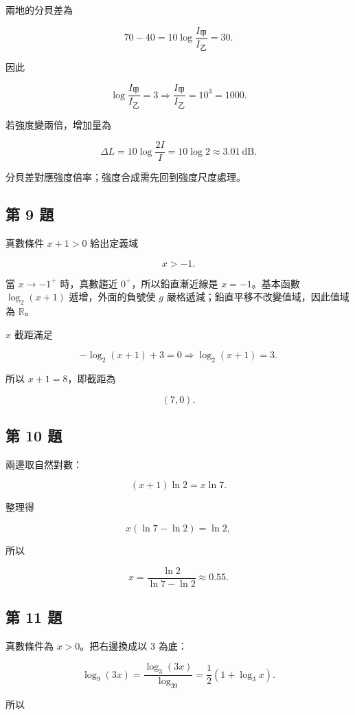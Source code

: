 \documentclass[11pt,a4paper]{article}
\begin{document}
兩地的分貝差為

\[
70-40
=10\log\frac{I_{\text{甲}}}{I_{\text{乙}}}
=30.
\]

因此

\[
\log\frac{I_{\text{甲}}}{I_{\text{乙}}}=3
\Rightarrow
\boxed{\frac{I_{\text{甲}}}{I_{\text{乙}}}=10^3=1000}.
\]

若強度變兩倍，增加量為

\[
\Delta L
=10\log\frac{2I}{I}
=10\log2
\approx\boxed{3.01\ \mathrm{dB}}.
\]

分貝差對應強度倍率；強度合成需先回到強度尺度處理。

\subsection{第 9 題}\label{ux7b2c-9-ux984c}

真數條件 \(x+1>0\) 給出定義域

\[
\boxed{x>-1}.
\]

當 \(x\to-1^+\) 時，真數趨近 \(0^+\)，所以鉛直漸近線是 \(\boxed{x=-1}\)。基本函數 \(\log_2(x+1)\) 遞增，外面的負號使 \(g\) 嚴格遞減；鉛直平移不改變值域，因此值域為 \(\mathbb R\)。

\(x\) 截距滿足

\[
-\log_2(x+1)+3=0
\Longrightarrow
\log_2(x+1)=3.
\]

所以 \(x+1=8\)，即截距為

\[
\boxed{(7,0)}.
\]

\subsection{第 10 題}\label{ux7b2c-10-ux984c}

兩邊取自然對數：

\[
(x+1)\ln2=x\ln7.
\]

整理得

\[
x(\ln7-\ln2)=\ln2,
\]

所以

\[
\boxed{x=\frac{\ln2}{\ln7-\ln2}}
\approx\boxed{0.55}.
\]

\subsection{第 11 題}\label{ux7b2c-11-ux984c}

真數條件為 \(x>0\)。把右邊換成以 \(3\) 為底：

\[
\log_9(3x)
=\frac{\log_3(3x)}{\log_39}
=\frac12(1+\log_3x).
\]

所以
\end{document}
